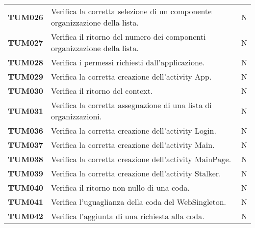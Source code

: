 \documentclass[../piano-di-qualifica.tex]{subfiles}
\begin{document}
\begin{longtable}[H]{>{\centering\bfseries}m{3cm} >{}m{10cm} >{\centering\arraybackslash}m{3cm}}
  TUM026             & Verifica la corretta selezione di un componente organizzazione della lista. & N\\ %

  TUM027             & Verifica il ritorno del numero dei componenti organizzazione della lista. & N\\ %

  TUM028             & Verifica i permessi richiesti dall'applicazione. & N\\ %



  TUM029             & Verifica la corretta creazione dell'activity App. & N\\ %

  TUM030             & Verifica il ritorno del context. & N\\ %

  TUM031             & Verifica la corretta assegnazione di una lista di organizzazioni. & N\\ %


  TUM036             & Verifica la corretta creazione dell'activity Login. & N\\ %

  TUM037             & Verifica la corretta creazione dell'activity Main. & N\\ %

  TUM038             & Verifica la corretta creazione dell'activity MainPage. & N\\ %

  TUM039             & Verifica la corretta creazione dell'activity Stalker. & N\\ %

  TUM040             & Verifica il ritorno non nullo di una coda. & N\\ %

  TUM041             & Verifica l'uguaglianza della coda del WebSingleton. & N\\ %

  TUM042             & Verifica l'aggiunta di una richiesta alla coda. & N\\ %


\end{longtable}
\end{document}
